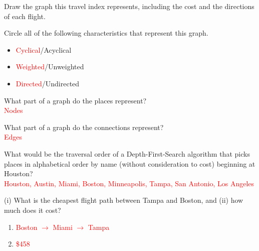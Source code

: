 \documentclass[11pt,addpoints]{exam}
\begin{document}
\begin{questions}
\begin{enumerate}[label=(\Alph*)]
  \begin{minipage}{\textwidth}
  \item Draw the graph this travel index represents, including the cost and the directions of each flight.
  
  \end{minipage}

  \item Circle all of the following characteristics that represent this graph.

  \begin{itemize}
    \item \textcolor{red}{Cyclical}/Acyclical
    \item \textcolor{red}{Weighted}/Unweighted
    \item \textcolor{red}{Directed}/Undirected \\
  \end{itemize}

  \item What part of a graph do the places represent? \\ 

  \textcolor{red}{Nodes} \\

  \item What part of a graph do the connections represent?  \\

  \textcolor{red}{Edges} \\

  \item What would be the traversal order of a Depth-First-Search algorithm that picks places in alphabetical order by name (without consideration to cost) beginning at Houston? \\

  \textcolor{red}{Houston, Austin, Miami, Boston, Minneapolis, Tampa, San Antonio, Los Angeles} \\

  \item (i) What is the cheapest flight path between Tampa and Boston, and (ii) how much does it cost? \\

    \begin{enumerate}[label=(\alph*)]
      \item \textcolor{red}{Boston $\to$ Miami $\to$ Tampa}
      \item \textcolor{red}{\$458}
    \end{enumerate}
\end{enumerate}


\end{questions}
\end{document}
